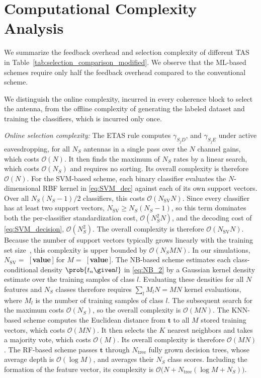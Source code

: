 \section{Computational Complexity Analysis}
\label{sec:complexity}
We summarize the feedback overhead and selection complexity of different
TAS  in Table~\ref{tab:selection_comparison_modified}.
 We observe that the ML-based schemes require
only half the feedback overhead compared to the conventional scheme.
{\color{blue}
We distinguish the online complexity, incurred in every coherence block
to select the antenna, from the offline complexity of generating the
labeled dataset and training the classifiers, which is incurred only once.

\emph{Online selection complexity:} The ETAS rule computes
$\gamma_{S_jD}$, and $\gamma_{S_jE}$ under active eavesdropping, for all
$N_S$ antennas in a single pass over the $N$ channel gains, which costs
$\mathcal{O}(N)$. It then finds the maximum of $N_S$ rates by a linear
search, which costs $\mathcal{O}(N_S)$ and requires no sorting. Its
overall complexity is therefore $\mathcal{O}(N)$.
For the SVM-based scheme, each binary classifier evaluates the
$N$-dimensional RBF kernel in \eqref{eq:SVM_dec} against each of its own
support vectors. Over all $N_S(N_S-1)/2$ classifiers, this costs
$\mathcal{O}(N_{\mathrm{SV}}N)$. Since every classifier has at least two
support vectors, $N_{\mathrm{SV}}\geq N_S(N_S-1)$, so this term dominates
both the per-classifier standardization cost, $\mathcal{O}(N_S^2N)$, and
the decoding cost of \eqref{eq:SVM_decision}, $\mathcal{O}(N_S^2)$. The
overall complexity is therefore $\mathcal{O}(N_{\mathrm{SV}}N)$. Because
the number of support vectors typically grows linearly with the training
set size~\cite{Bottou_Lin_2007_LSKM}, this complexity is upper bounded by
$\mathcal{O}(N_SMN)$.
In our simulations, $N_{\mathrm{SV}}=$~[\,\textbf{value}\,] for
$M=$~[\,\textbf{value}\,].
The NB-based scheme estimates each class-conditional density
$\prob{t_n\given l}$ in \eqref{eq:NB_2} by a Gaussian kernel density
estimate over the training samples of class $l$. Evaluating these
densities for all $N$ features and $N_S$ classes therefore requires
$\sum_{l}M_l N = MN$ kernel evaluations, where $M_l$ is the number of
training samples of class $l$. The subsequent search for the maximum
costs $\mathcal{O}(N_S)$, so the overall complexity is $\mathcal{O}(MN)$.
The KNN-based scheme computes the Euclidean distance from $\mathbf{t}$ to
all $M$ stored training vectors, which costs $\mathcal{O}(MN)$. It then
selects the $K$ nearest neighbors and takes a majority vote, which costs
$\mathcal{O}(M)$. Its overall complexity is therefore $\mathcal{O}(MN)$.
The RF-based scheme passes $\mathbf{t}$ through $N_{\mathrm{tree}}$ fully grown decision
trees, whose average depth is $\mathcal{O}(\log M)$, and averages their
$N_S$ class scores. Including the formation of the feature vector, its
complexity is $\mathcal{O}\big(N+N_{\mathrm{tree}}(\log M+N_S)\big)$.

}
